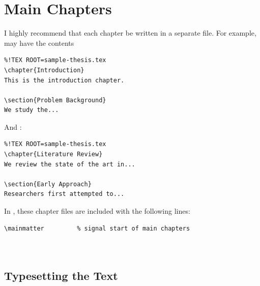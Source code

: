 \documentclass[a4paper,nofonts,raggedright,titlepage,openany]{tufte-book}
\begin{document}
\section{Main Chapters}

I highly recommend that each chapter be written in a separate file. For example,  may have the contents  


\begin{verbatim}
%!TEX ROOT=sample-thesis.tex
\chapter{Introduction}
This is the introduction chapter.

\section{Problem Background}
We study the...
\end{verbatim}

And :

\begin{verbatim}
%!TEX ROOT=sample-thesis.tex
\chapter{Literature Review}
We review the state of the art in...

\section{Early Approach}
Researchers first attempted to...
\end{verbatim}


In , these chapter files are included with the following lines:

\begin{verbatim}
\mainmatter         % signal start of main chapters



\end{verbatim}


\subsection{Typesetting the Text}
\end{document}
